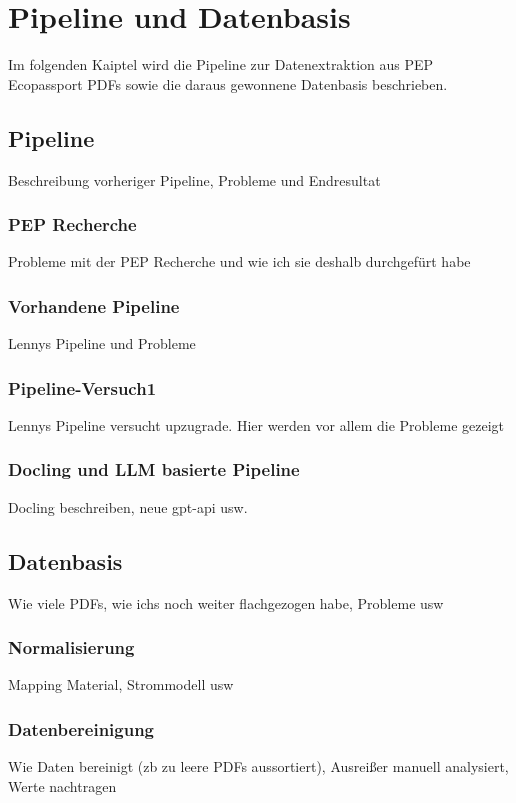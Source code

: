 \chapter{Pipeline und Datenbasis}
Im folgenden Kaiptel wird die Pipeline zur Datenextraktion aus PEP Ecopassport PDFs sowie die daraus gewonnene Datenbasis beschrieben.
 
\section{Pipeline}

Beschreibung vorheriger Pipeline, Probleme und Endresultat

\subsection{PEP Recherche}
Probleme mit der PEP Recherche und wie ich sie deshalb durchgefürt habe

\subsection{Vorhandene Pipeline}
Lennys Pipeline und Probleme

\subsection{Pipeline-Versuch1}
Lennys Pipeline versucht upzugrade. Hier werden vor allem die Probleme gezeigt

\subsection{Docling und LLM basierte Pipeline}
Docling beschreiben, neue gpt-api usw.


\section{Datenbasis}
Wie viele PDFs, wie ichs noch weiter flachgezogen habe, Probleme usw

\subsection{Normalisierung}
Mapping Material, Strommodell usw

\subsection{Datenbereinigung} 
Wie Daten bereinigt (zb zu leere PDFs aussortiert), Ausreißer manuell analysiert, Werte nachtragen
